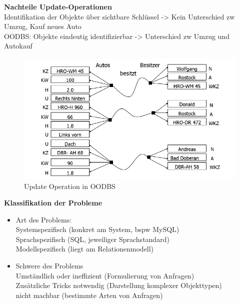 \textbf{Nachteile Update-Operationen}\\
Identifikation der Objekte über sichtbare Schlüssel -> Kein Unterschied zw Umzug, Kauf neues Auto\\
OODBS: Objekte eindeutig identifizierbar -> Unterschied zw Umzug und Autokauf
\begin{figure}[!h]
	\centering
	\includegraphics[scale=0.6]{img/object_identity.png}
	\caption{Update Operation in OODBS}
\end{figure}

\textbf{Klassifikation der Probleme}
\begin{itemize}
	\item Art des Problems:\\
	Systemspezifisch (konkret am System, bspw MySQL)\\
	Sprachspezifisch (SQL, jeweiliger Sprachstandard)\\
	Modellspezifisch (liegt am Relationenmodell)
	
	\item Schwere des Problems\\
	Umständlich oder ineffizient (Formulierung von Anfragen)\\
	Zusätzliche Tricks notwendig (Darstellung komplexer Objekttypen)\\
	nicht machbar (bestimmte Arten von Anfragen)
\end{itemize}